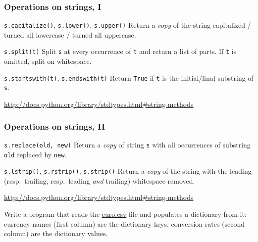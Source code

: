 \documentclass[english,serif,mathserif,xcolor=pdftex,dvipsnames,table]{beamer}
\begin{document}
\begin{frame}[fragile]
  \frametitle{Operations on strings, I}
  \begin{describe}{%
      \lstinline|s.capitalize()|,
      \lstinline|s.lower()|,
      \lstinline|s.upper()|}
    Return a \emph{copy} of the string capitalized / turned all lowercase /
    turned all uppercase.
  \end{describe}

  \begin{describe}{\lstinline|s.split(t)|}
    Split \texttt{s} at every occurrence of \texttt{t} and return a list
    of parts.  If \texttt{t} is omitted, split on whitespace.
  \end{describe}

  \begin{describe}{\lstinline|s.startswith(t)|,
      \lstinline|s.endswith(t)|}
    Return \texttt{True} if \texttt{t} is the initial/final substring
    of \texttt{s}.
  \end{describe}

  \begin{references}
    \url{http://docs.python.org/library/stdtypes.html#string-methods}
  \end{references}
\end{frame}


\begin{frame}[fragile]
  \frametitle{Operations on strings, II}
  \begin{describe}{\lstinline|s.replace(old, new)|}
    Return a \emph{copy} of string \texttt{s} with all occurrences of
    substring \texttt{old} replaced by \texttt{new}.
  \end{describe}

  \begin{describe}{%
      \lstinline|s.lstrip()|,
      \lstinline|s.rstrip()|,
      \lstinline|s.strip()|}
    Return a \emph{copy} of the string with the leading (resp.\ trailing,
    resp.\ leading \emph{and} trailing) whitespace removed.
  \end{describe}

  \begin{references}
    \url{http://docs.python.org/library/stdtypes.html#string-methods}
  \end{references}
\end{frame}


\begin{frame}[fragile]
  \begin{exercise}
    Write a program that reads the
    \href{https://raw.github.com/gc3-uzh-ch/python-course/master/euro.csv}{euro.csv}
    file and populates a dictionary from it: currency names (first
    column) are the dictionary keys, conversion rates (second column)
    are the dictionary values.
  \end{exercise}

\end{frame}
\end{document}
